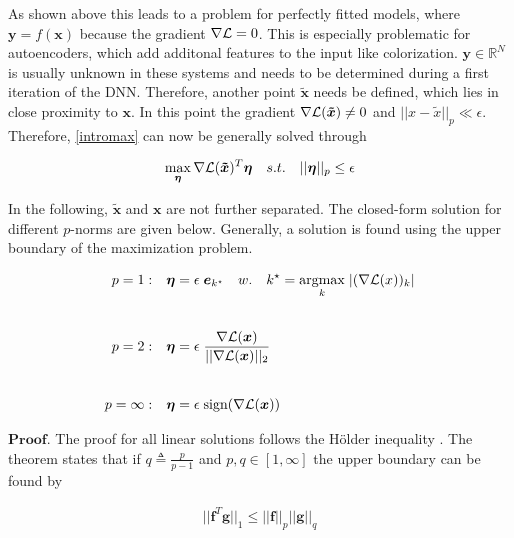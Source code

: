\begingroup
As shown above this leads to a problem for perfectly fitted models, where $ \bm{y} = f(\bm{x})$ because the gradient $\nabla \mathcal{L} = 0$. This
is especially problematic for autoencoders, which add additonal features to the input like colorization. $\bm{y} \in \mathbb{R}^N$ is
usually unknown in these systems and needs to be determined during a first iteration of the DNN. Therefore,
another point $ \bm{\tilde{x}}$ needs be defined, which lies in close proximity to $\bm{x}$. In this point the gradient $ \nabla \mathcal{L}(\bm{\tilde{x}}) \neq 0 $
and $ \lvert\lvert x - \tilde{x} \rvert\rvert_p \ll \epsilon $. Therefore, \ref{intromax} can now be generally solved through
\endgroup


\begin{equation}
\begin{aligned}
	\max_{\bm{\eta}} \nabla \mathcal{L}(\bm{\tilde{x}})^T \bm{\eta} \quad s.t. \quad \lvert\lvert \bm{\eta} \rvert\rvert_p \leq \epsilon
\end{aligned}
\label{maxlinopt}
\end{equation}

\begingroup
In the following, $\bm{\tilde{x}}$ and $\bm{x}$ are not further separated.
The closed-form solution for different $p$-norms are given below. Generally, a solution is found using
the upper boundary of the maximization problem.
\endgroup

\begin{equation}
\begin{aligned}
p = 1: & \quad \bm{\eta} = \epsilon \; \bm{e}_{k^\star} \quad w. \quad k^\star = \operatorname*{argmax}_{k} \; \lvert (\nabla \mathcal{L}(x))_k \rvert \\[20pt]
p = 2: & \quad \bm{\eta} = \epsilon \; \frac{\nabla \mathcal{L}(\bm{x})}{\lvert\lvert \nabla \mathcal{L}(\bm{x}) \rvert\rvert_2} \\[20pt]
p = \infty: & \quad \bm{\eta} = \epsilon \; \text{sign}(\nabla \mathcal{L}(\bm{x}))
\end{aligned}
\label{linear_programming_closed}
\end{equation}


$\bm{Proof.}$ The proof for all linear solutions follows the Hölder inequality \cite{Hoelder}. The theorem states that if $q \triangleq \frac{p}{p-1}$ and $p, q \in [1, \infty]$
the upper boundary can be found by

\begin{equation}
\begin{aligned}
	\lvert\lvert \bm{f}^T\bm{g} \rvert\rvert_1 \leq \lvert\lvert \bm{f} \rvert\rvert_p \lvert\lvert \bm{g} \rvert\rvert_q
\end{aligned}
\label{hoelders_inequality}
\end{equation}

